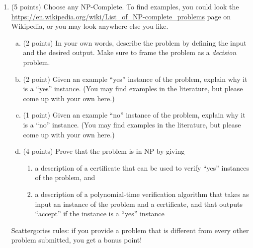 \documentclass[11pt]{article}
\begin{document}
\begin{enumerate}
\item (5 points) Choose any NP-Complete. To find examples, you could look
the \url{https://en.wikipedia.org/wiki/List_of_NP-complete_problems} page on Wikipedia, or you may look anywhere else
you like.
\begin{enumerate}[(a)]
    \item (2 points) In your own words, describe the problem by defining the input and the desired output. Make sure to
    frame the problem as a \emph{decision} problem.
    \item (2 point) Given an example ``yes'' instance of the problem, explain why it is a ``yes'' instance.
    (You may find examples in the literature, but please come up with your own here.)
    \item (1 point) Given an example ``no'' instance of the problem, explain why it is a ``no'' instance.
    (You may find examples in the literature, but please come up with your own here.)
    \item (4 points) Prove that the problem is in NP by giving
    \begin{enumerate}
        \item a description of a certificate that can be used to verify ``yes'' instances of the problem, and
        \item a description of a polynomial-time verification algorithm that
        takes as input an instance of the problem and a certificate, and that
        outputs ``accept'' if the instance is a ``yes'' instance
    \end{enumerate}
\end{enumerate}
Scattergories rules: if you provide a problem that is different from
every other problem submitted, you get a bonus point!
\end{enumerate}






\end{document}
